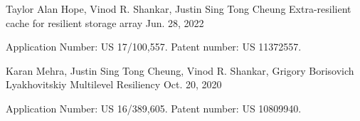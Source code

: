 

\begin{cventries}

  \cventry
    {Taylor Alan Hope, Vinod R. Shankar, Justin Sing Tong Cheung} %
    {Extra-resilient cache for resilient storage array}
    {}
    {Jun. 28, 2022} %
    {
      \begin{cvitems}
        \item {
          Application Number: US 17/100,557. Patent number: US 11372557.
        }
      \end{cvitems}
    }

  \cventry
    {Karan Mehra, Justin Sing Tong Cheung, Vinod R. Shankar, Grigory Borisovich Lyakhovitskiy} %
    {Multilevel Resiliency}
    {}
    {Oct. 20, 2020} %
    {
      \begin{cvitems}
        \item {
          Application Number: US 16/389,605. Patent number: US 10809940.
        }
      \end{cvitems}
    }

\end{cventries}